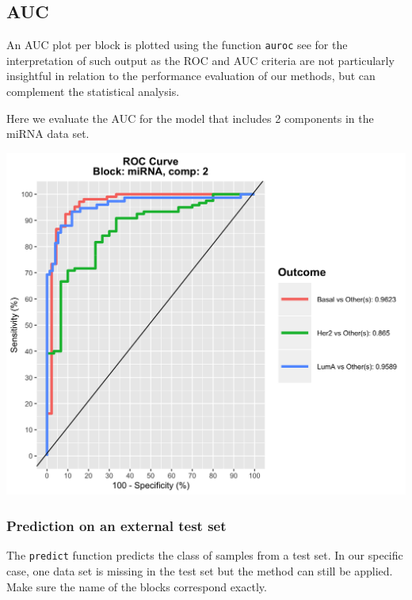 \documentclass[]{book}
\newenvironment{Shaded}{\begin{snugshade}}{\end{snugshade}}
\newcommand{\KeywordTok}[1]{\textcolor[rgb]{0.13,0.29,0.53}{\textbf{#1}}}
\newcommand{\DataTypeTok}[1]{\textcolor[rgb]{0.13,0.29,0.53}{#1}}
\newcommand{\StringTok}[1]{\textcolor[rgb]{0.31,0.60,0.02}{#1}}
\newcommand{\CommentTok}[1]{\textcolor[rgb]{0.56,0.35,0.01}{\textit{#1}}}
\newcommand{\OperatorTok}[1]{\textcolor[rgb]{0.81,0.36,0.00}{\textbf{#1}}}
\newcommand{\NormalTok}[1]{#1}
\theoremstyle{definition}
\theoremstyle{definition}
\theoremstyle{definition}
\theoremstyle{remark}
\begin{document}
\subsection{AUC}\label{auc}

An AUC plot per block is plotted using the function \texttt{auroc} see
\citep{mixomics}for the interpretation of such output as the ROC and AUC
criteria are not particularly insightful in relation to the performance
evaluation of our methods, but can complement the statistical analysis.

Here we evaluate the AUC for the model that includes 2 components in the
miRNA data set.

\begin{center}\includegraphics[width=0.5\linewidth]{Figures/unnamed-chunk-12-1} \end{center}

\subsubsection{Prediction on an external test
set}\label{prediction-on-an-external-test-set}

The \texttt{predict} function predicts the class of samples from a test
set. In our specific case, one data set is missing in the test set but
the method can still be applied. Make sure the name of the blocks
correspond exactly.

\begin{Shaded}
\end{Shaded}
\end{document}
